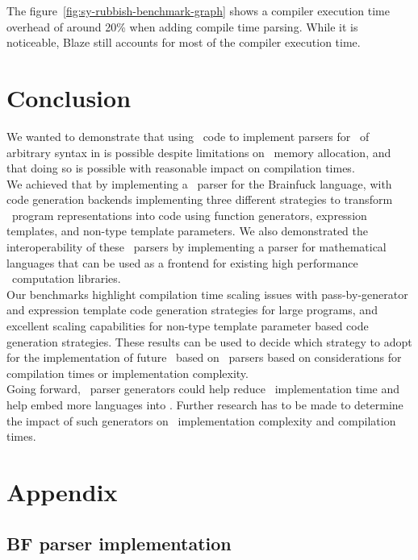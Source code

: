 \documentclass[../../main.tex]{subfiles}
\begin{document}
The figure~\ref{fig:sy-rubbish-benchmark-graph} shows a compiler execution time
overhead of around 20\% when adding compile time parsing.
While it is noticeable, Blaze still accounts for most of the compiler execution
time.

\clearpage%

\section{Conclusion}

We wanted to demonstrate that using \constexpr~code to implement parsers for
\dsel~of arbitrary syntax in  is possible despite limitations on
\constexpr~memory allocation, and that doing so is possible with reasonable
impact on compilation times.\\

We achieved that by implementing a \constexpr~parser for the Brainfuck language,
with code generation backends implementing three different strategies to
transform \constexpr~program representations into code using function
generators, expression templates, and non-type template parameters.
We also demonstrated the interoperability of these \constexpr~parsers by
implementing a parser for mathematical languages that can be used as a frontend
for existing high performance \cpp~computation libraries.\\

Our benchmarks highlight compilation time scaling issues with pass-by-generator
and expression template code generation strategies for large programs, and
excellent scaling capabilities for non-type template parameter based code
generation strategies. These results can be used to decide which strategy to
adopt for the implementation of future \dsel~based on \constexpr~parsers
based on considerations for compilation times or implementation complexity.\\

Going forward, \constexpr~parser generators could help reduce
\dsel~implementation time and help embed more languages into . Further research
has to be made to determine the impact of such generators on
\dsel~implementation complexity and compilation times.


\appendix
\section{Appendix}

\subsection{BF parser implementation}\label{app:bf-parser}


\end{document}
